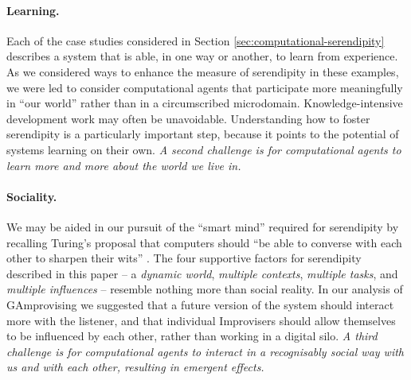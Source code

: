 \paragraph{\textbf{Learning}.} Each of the case studies considered in
  Section \ref{sec:computational-serendipity} describes a system that
  is able, in one way or another, to learn from experience.  As we
  considered ways to enhance the measure of serendipity in these
  examples, we were led to consider computational agents that
  participate more meaningfully in ``our world'' rather than in a
  circumscribed microdomain.  Knowledge-intensive development work may
  often be unavoidable.  Understanding how to foster serendipity is a
  particularly important step, because it points to the potential of
  systems learning on their own.  \emph{A second challenge is for
    computational agents to learn more and more about the world we
    live in.}

\paragraph{\textbf{Sociality}.} We may be aided in our pursuit of the
  ``smart mind'' \cite{campbell2005serendipity} required for
serendipity by recalling Turing's proposal that computers should ``be
able to converse with each other to sharpen their wits''
\cite{turing-intelligent}.    The four
supportive factors for serendipity described in this paper -- a
\emph{dynamic world}, \emph{multiple contexts},
\emph{multiple tasks}, and \emph{multiple
  influences} -- resemble nothing more than social
reality.  In our analysis of {\sf GAmprovising} we suggested
that a future version of the system should interact more with the listener, and that individual
Improvisers should allow themselves to be influenced by each other,
rather than working in a digital silo.  \emph{A third challenge is for
  computational agents to interact in a recognisably social way with
  us and with each other, resulting in emergent effects.}

